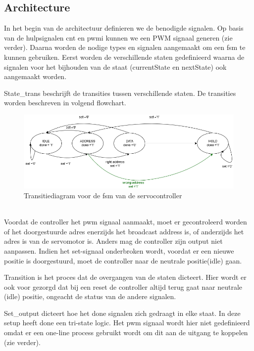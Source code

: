 \subsection{Architecture}
In het begin van de architectuur definieren we de benodigde signalen. Op basis van de hulpsignalen cnt en pwmi kunnen we een PWM signaal generen (zie verder). Daarna worden de nodige types en signalen aangemaakt om een \gls{fsm} te kunnen gebruiken. Eerst worden de verschillende staten gedefinieerd waarna de signalen voor het bijhouden van de staat (currentState en nextState) ook aangemaakt worden.


State\_trans beschrijft de transities tussen verschillende staten. De transities worden beschreven in volgend flowchart.
\begin{figure}[h]
	\centering
	\includegraphics[width=\linewidth]{servocontrol.png}
	\caption{Transitiediagram voor de \gls{fsm} van de servocontroller}
\end{figure}\\
 Voordat de controller het \gls{pwm} signaal aanmaakt, moet er gecontroleerd worden of het doorgestuurde adres enerzijds het broadcast address is, of anderzijds het adres is van de servomotor is. Anders mag de controller zijn output niet aanpassen. Indien het set-signaal onderbroken wordt, voordat er een nieuwe positie is doorgestuurd, moet de controller naar de neutrale positie(idle) gaan.


Transition is het proces dat de overgangen van de staten dicteert. Hier wordt er ook voor gezorgd dat bij een reset de controller altijd terug gaat naar neutrale (idle) positie, ongeacht de status van de andere signalen.


Set\_output dicteert hoe het done signalen zich gedraagt in elke staat. In deze setup heeft done een tri-state logic. Het \gls{pwm} signaal wordt hier niet gedefinieerd omdat er een one-line process gebruikt wordt om dit aan de uitgang te koppelen (zie verder).


